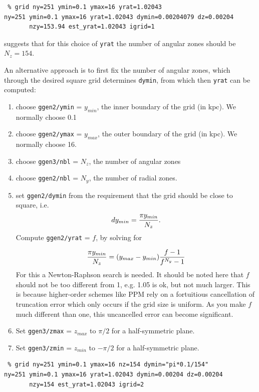 \documentclass[10pt,dvips]{article}
\begin{document}
\begin{verbatim}
 % grid ny=251 ymin=0.1 ymax=16 yrat=1.02043
ny=251 ymin=0.1 ymax=16 yrat=1.02043 dymin=0.00204079 dz=0.00204 
       nzy=153.94 est_yrat=1.02043 igrid=1

\end{verbatim}
suggests that for this choice of {\tt yrat} the number of angular zones should be
$N_z=154$.

An alternative approach is to first fix the number of angular zones, which  through
the desired square grid determines {\tt dymin},
from which then {\tt yrat} can be computed:

\begin{enumerate}
\item
choose  {\tt ggen2/ymin} = $y_{min}$, the inner boundary of the grid (in kpc).
We normally choose 0.1

\item
choose {\tt ggen2/ymax} = $y_{max}$, the outer boundary of the grid (in kpc).
We normally choose 16.

\item
choose {\tt ggen3/nbl} = $N_z$, the number of angular zones

\item
choose {\tt ggen2/nbl} = $N_y$, the number of radial zones.

\item
set {\tt ggen2/dymin} from the requirement that the grid should
be close to square, i.e.
$$
   dy_{min} = {  {\pi y_{min}} \over N_z}.
$$
Compute {\tt ggen2/yrat} = $f$, by solving for

$$
   {{\pi y_{min}} \over N_z} = (y_{max}-y_{min}) { {f-1} \over {f^{N_y}-1} }
$$
For this a Newton-Raphson search is needed. It should be noted here that $f$ should 
not be too different from 1, e.g. 1.05 is ok, but not much larger. This is because
higher-order schemes like PPM rely on a fortuitious cancellation of 
truncation error which only occurs if the grid size is uniform.  As you 
make $f$ much different than one, this uncancelled error can become 
significant.  

\item
Set {\tt ggen3/zmax} = $z_{max}$  to $\pi/2$ for a half-symmetric plane.

\item
Set {\tt ggen3/zmin} = $z_{min}$ to $-\pi/2$ for a half-symmetric plane.

\end{enumerate}


\begin{verbatim}
 % grid ny=251 ymin=0.1 ymax=16 nz=154 dymin="pi*0.1/154"
ny=251 ymin=0.1 ymax=16 yrat=1.02043 dymin=0.00204 dz=0.00204 
       nzy=154 est_yrat=1.02043 igrid=2

\end{verbatim}
\end{document}
